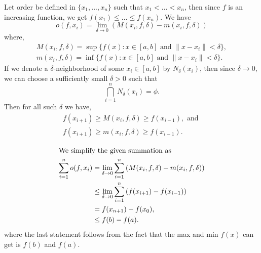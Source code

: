 
\begin{solution}
    Let order be defined in $\{x_1, . . . ,x_n\}$ such that 
    $x_1<...<x_n$, then since $f$ is an increasing function, 
    we get $f(x_1)\le...\le f(x_n)$. We have
    $$o(f,x_i)=\lim_{\delta\to 0}{(M(x_i,f,\delta)-m(x_i,f,\delta) )}$$
    where,
    $$\begin{array}{cc}
        M(x_i,f,\delta) = \sup {\{f(x):x\in [a,b] \text{ and }
         \|x-x_i\|<\delta}\},\\
        m(x_i,f,\delta) = \inf {\{f(x):x\in [a,b] \text{ and }
         \|x-x_i\|<\delta}\}.
    \end{array}$$
    If we denote a $\delta$-neighborhood of some 
    $x_i\in [a,b]$ by $N_{\delta}(x_i)$, then since $\delta\to 0$, 
    we can choose a sufficiently small $\delta>0$ such that
    $$\bigcap_{i=1}^{n}{N_{\delta}(x_i)}=\phi.$$ Then for all 
    such $\delta$ we have, 
    $$\begin{array}{cc}
        f(x_{i+1})\ge M(x_i,f,\delta)\ge f(x_{i-1}),\text{ and }\\
        f(x_{i+1})\ge m(x_i,f,\delta)\ge f(x_{i-1}).
    \end{array}$$
    
    \begin{align*}
        \shortintertext{We simplify the given summation as}
        \sum_{i=1}^{n}{o(f,x_i)} &= 
            \lim_{\delta\to 0}{\sum_{i=1}^{n}
            {(M(x_i,f,\delta)-m(x_i,f,\delta))}}\\
        & \le \lim_{\delta \to 0}\sum_{i=1}^{n}
            {(f(x_{i+1}) - f(x_{i-1})})\\
        & = f(x_{n+1})-f(x_{0}),\\
        & \le f(b)-f(a).
    \end{align*}
    where the last statement follows from the fact that 
    the max and min $f(x)$ can get is $f(b)$ and $f(a)$.
    \qedsymbol
\end{solution}